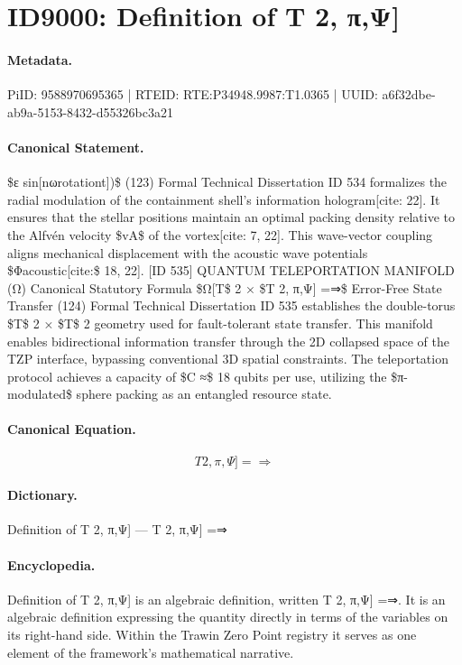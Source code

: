 \section*{ID9000: Definition of T 2, π,Ψ]}
\paragraph{Metadata.}
PiID: 9588970695365 | RTEID: RTE:P34948.9987:T1.0365 | UUID: a6f32dbe-ab9a-5153-8432-d55326bc3a21

\paragraph{Canonical Statement.}
\$ε sin[nωrotationt])\$ (123) Formal Technical Dissertation ID 534 formalizes the radial modulation of the containment shell’s information hologram[cite: 22]. It ensures that the stellar positions maintain an optimal packing density relative to the Alfvén velocity \$vA\$ of the vortex[cite: 7, 22]. This wave-vector coupling aligns mechanical displacement with the acoustic wave potentials \$Φacoustic[cite:\$ 18, 22]. [ID 535] QUANTUM TELEPORTATION MANIFOLD (Ω) Canonical Statutory Formula \$Ω[T\$ 2 × \$T 2, π,Ψ] =⇒\$ Error-Free State Transfer (124) Formal Technical Dissertation ID 535 establishes the double-torus \$T\$ 2 × \$T\$ 2 geometry used for fault-tolerant state transfer. This manifold enables bidirectional information transfer through the 2D collapsed space of the TZP interface, bypassing conventional 3D spatial constraints. The teleportation protocol achieves a capacity of \$C ≈\$ 18 qubits per use, utilizing the \$π-modulated\$ sphere packing as an entangled resource state.

\paragraph{Canonical Equation.}
\[
T 2, π,Ψ] =⇒
\]

\paragraph{Dictionary.}
Definition of T 2, π,Ψ] — T 2, π,Ψ] =⇒

\paragraph{Encyclopedia.}
Definition of T 2, π,Ψ] is an algebraic definition, written T 2, π,Ψ] =⇒. It is an algebraic definition expressing the quantity directly in terms of the variables on its right-hand side. Within the Trawin Zero Point registry it serves as one element of the framework's mathematical narrative.
